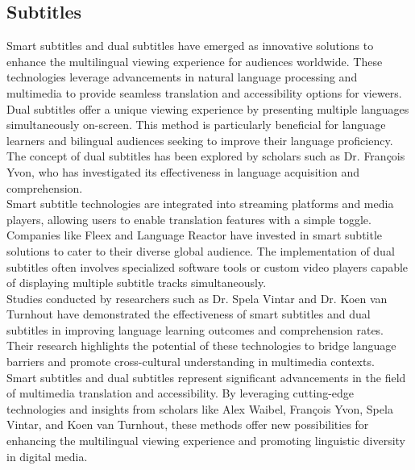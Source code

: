 \documentclass[12pt]{article}
\begin{document}
\subsection{Subtitles}
Smart subtitles and dual subtitles have emerged as innovative solutions to enhance the multilingual viewing experience for audiences worldwide. These technologies leverage advancements in natural language processing and multimedia to provide seamless translation and accessibility options for viewers. \\
Dual subtitles offer a unique viewing experience by presenting multiple languages simultaneously on-screen. This method is particularly beneficial for language learners and bilingual audiences seeking to improve their language proficiency. The concept of dual subtitles has been explored by scholars such as Dr. François Yvon, who has investigated its effectiveness in language acquisition and comprehension.\\
Smart subtitle technologies are integrated into streaming platforms and media players, allowing users to enable translation features with a simple toggle. Companies like Fleex and Language Reactor have invested in smart subtitle solutions to cater to their diverse global audience. The implementation of dual subtitles often involves specialized software tools or custom video players capable of displaying multiple subtitle tracks simultaneously. \\
Studies conducted by researchers such as Dr. Spela Vintar and Dr. Koen van Turnhout have demonstrated the effectiveness of smart subtitles and dual subtitles in improving language learning outcomes and comprehension rates. Their research highlights the potential of these technologies to bridge language barriers and promote cross-cultural understanding in multimedia contexts.\\
Smart subtitles and dual subtitles represent significant advancements in the field of multimedia translation and accessibility. By leveraging cutting-edge technologies and insights from scholars like Alex Waibel, François Yvon, Spela Vintar, and Koen van Turnhout, these methods offer new possibilities for enhancing the multilingual viewing experience and promoting linguistic diversity in digital media.
\end{document}

